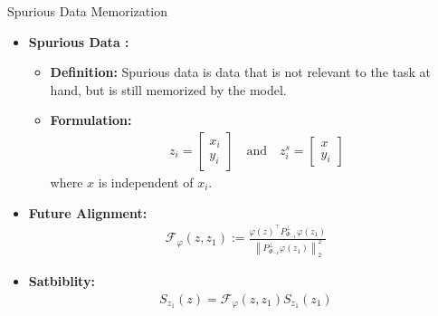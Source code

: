 \documentclass[serif, aspectratio=169]{beamer}
\begin{document}
\begin{frame}{Spurious Data Memorization}
	\begin{itemize}
		\item \textbf{Spurious Data :}
		\begin{itemize}
			\item \textbf{Definition: }
			Spurious data is data that is not relevant to the task at hand, but is still memorized by the model.
			\item \textbf{Formulation: }
			\begin{align*}
				z_i = \begin{bmatrix}
					x_i \\ y_i
				\end{bmatrix}
				\quad \text{and} \quad
				z_{i}^{s} = \begin{bmatrix}
					x \\ y_i
				\end{bmatrix}
			\end{align*}
			where $x$ is independent of $x_i$.
		\end{itemize}
		\item \textbf{Future Alignment:}
		\begin{align*}
			\mathcal{F}_\varphi(z, z_1) := \frac{\varphi(z)^\top P_{\Phi_{-1}}^\perp \varphi(z_1)}{\left\| P_{\Phi_{-1}}^\perp \varphi(z_1) \right\|_2^2}
		\end{align*}
		\item \textbf{Satbiblity:}
		\begin{align*}
			S_{z_1}(z) = \mathcal{F}_\varphi(z, z_1) S_{z_1}(z_1)
		\end{align*}
	\end{itemize}
\end{frame}
\end{document}

